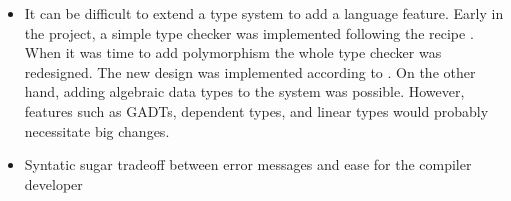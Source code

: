 \begin{itemize}
    \item It can be difficult to extend a type system to add a language feature.
    Early in the project, a simple type checker was implemented following the recipe \citep{bidir}.
    When it was time to add polymorphism the whole type checker was redesigned. The new design 
    was implemented according to \citep{bidir-higher}. On the other hand, adding algebraic data types to the system was possible. However, features such as GADTs, dependent types, and linear types would probably necessitate big changes.
    \item Syntatic sugar tradeoff between error messages and ease for the compiler developer
\end{itemize}